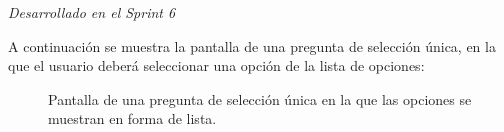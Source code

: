 \label{sec:pregunic1}
\textit{Desarrollado en el Sprint 6}

A continuación se muestra la pantalla de una pregunta de selección única, en la que el usuario deberá seleccionar una opción de la lista de opciones:

\begin{figure}[H]%
  \centering
  \qquad
  \caption{Pantalla de una pregunta de selección única en la que las opciones se muestran en forma de lista.}%
  \label{fig:example}%
\end{figure}

